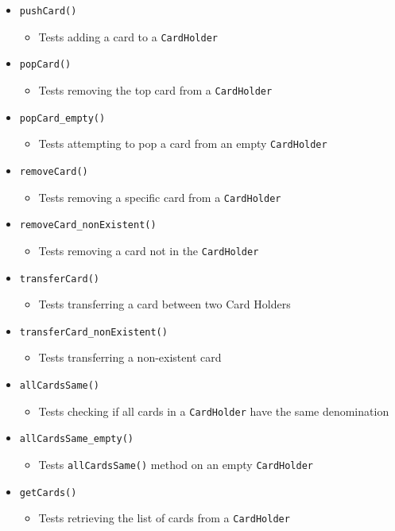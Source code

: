 \documentclass{article}
\begin{document}
\begin{itemize}
    \item \texttt{pushCard()}
          \begin{itemize}
              \item Tests adding a card to a \texttt{CardHolder}
          \end{itemize}
    \item \texttt{popCard()}
          \begin{itemize}
              \item Tests removing the top card from a \texttt{CardHolder}
          \end{itemize}
    \item \texttt{popCard\_empty()}
          \begin{itemize}
              \item Tests attempting to pop a card from an empty \texttt{CardHolder}
          \end{itemize}
    \item \texttt{removeCard()}
          \begin{itemize}
              \item Tests removing a specific card from a \texttt{CardHolder}
          \end{itemize}
    \item \texttt{removeCard\_nonExistent()}
          \begin{itemize}
              \item Tests removing a card not in the \texttt{CardHolder}
          \end{itemize}
    \item \texttt{transferCard()}
          \begin{itemize}
              \item Tests transferring a card between two Card Holders
          \end{itemize}
    \item \texttt{transferCard\_nonExistent()}
          \begin{itemize}
              \item Tests transferring a non-existent card
          \end{itemize}
    \item \texttt{allCardsSame()}
          \begin{itemize}
              \item Tests checking if all cards in a \texttt{CardHolder} have the same denomination
          \end{itemize}
    \item \texttt{allCardsSame\_empty()}
          \begin{itemize}
              \item Tests \texttt{allCardsSame()} method on an empty \texttt{CardHolder}
          \end{itemize}
    \item \texttt{getCards()}
          \begin{itemize}
              \item Tests retrieving the list of cards from a \texttt{CardHolder}
          \end{itemize}
\end{itemize}
\end{document}
